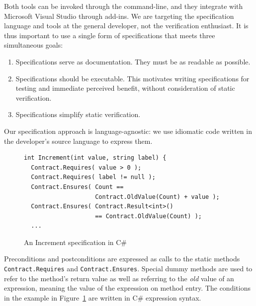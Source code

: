 \documentclass[10pt,twocolumn]{article}
\newcommand{\csharp}{C{\normalfont \#}}
\begin{document}
Both tools can be invoked through the command-line, 
and they integrate with Microsoft Visual Studio through add-ins. 
We are targeting the specification language and tools at the general
developer, not the verification enthusiast.
It is thus important to
use a single form of specifications that meets three
simultaneous goals:
\begin{enumerate}
\item Specifications serve as documentation. They must be as
  readable as possible.
\item Specifications should be executable. This
  motivates writing specifications for testing and immediate perceived
  benefit, without consideration of static verification.
\item Specifications simplify static verification.
\end{enumerate}
Our specification approach is language-agnostic: we use
idiomatic code written in the developer's source language to express
them. 
\begin{figure}[thb]
\begin{small}
\begin{lstlisting}
int Increment(int value, string label) {
  Contract.Requires( value > 0 );
  Contract.Requires( label != null );
  Contract.Ensures( Count == 
                    Contract.OldValue(Count) + value );
  Contract.Ensures( Contract.Result<int>()
                    == Contract.OldValue(Count) );
  ...
\end{lstlisting}
\caption{An Increment specification in \csharp}
\label{fig:csharp}
\end{small}
\end{figure}
Preconditions and postconditions are expressed as calls to the static
methods \lstinline{Contract.Requires} and
\lstinline{Contract.Ensures}. Special dummy methods are used to refer
to the method's return value as well as referring to the \emph{old}
value of an expression, meaning the value of the expression on method
entry. The conditions in the example in Figure~\ref{fig:csharp} are written in \csharp{}
expression syntax.
\end{document}
